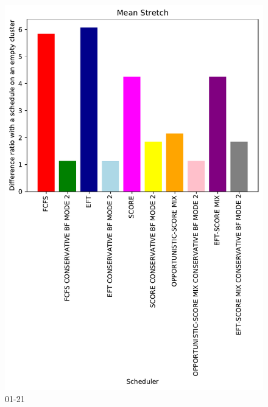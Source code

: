 \documentclass[a4paper]{article}
\begin{document}
\begin{figure}\includegraphics[width=0.9\linewidth]{MBSS/plot/Results_FCFS_Score_Backfill_2022-01-21->2022-01-21_V10000_Mean_Stretch_450_128_32_256_4_1024.pdf}\caption{01-21}\end{figure}
\end{document}

